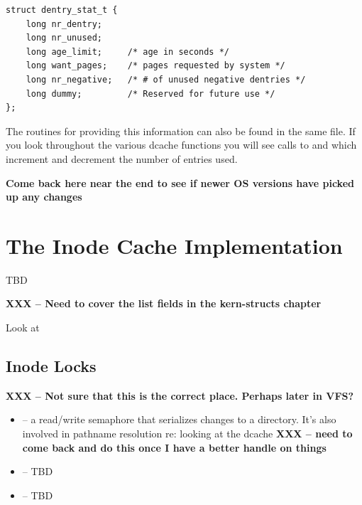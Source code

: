 \begin{lstlisting}
struct dentry_stat_t { 
    long nr_dentry;
    long nr_unused;
    long age_limit;     /* age in seconds */
    long want_pages;    /* pages requested by system */
    long nr_negative;   /* # of unused negative dentries */
    long dummy;         /* Reserved for future use */
};  
\end{lstlisting}

\noindent
The routines for providing this information can also be found in the same file. If you look throughout the various dcache functions you will see calls to  and  which increment and decrement the number of entries used.

\textbf{Come back here near the end to see if newer OS versions have picked up any changes}


\section{The Inode Cache Implementation}\label{vfs-inode-cache}

TBD

\textbf{XXX -- Need to cover the list fields in the kern-structs chapter}

Look at %


\subsection{Inode Locks}


\textbf{XXX -- Not sure that this is the correct place. Perhaps later in VFS?}

\begin{itemize}
	\item {} -- a read/write semaphore that serializes changes to a directory. It's also involved in pathname 
		resolution re: looking at the dcache \textbf{XXX -- need to come back and do this once I have a better 
		handle on things}
	\item {} -- TBD
	\item {} -- TBD
\end{itemize}

